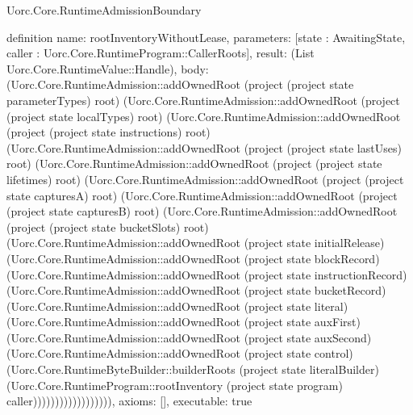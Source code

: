 \begin{lexlean}{Uorc.Core.RuntimeAdmissionBoundary}
\begin{semanticmodule}
definition{
  name: rootInventoryWithoutLease,
  parameters: [state : AwaitingState, caller : Uorc.Core.RuntimeProgram::CallerRoots],
  result: (List Uorc.Core.RuntimeValue::Handle),
  body: (Uorc.Core.RuntimeAdmission::addOwnedRoot (project (project state parameterTypes) root) (Uorc.Core.RuntimeAdmission::addOwnedRoot (project (project state localTypes) root) (Uorc.Core.RuntimeAdmission::addOwnedRoot (project (project state instructions) root) (Uorc.Core.RuntimeAdmission::addOwnedRoot (project (project state lastUses) root) (Uorc.Core.RuntimeAdmission::addOwnedRoot (project (project state lifetimes) root) (Uorc.Core.RuntimeAdmission::addOwnedRoot (project (project state capturesA) root) (Uorc.Core.RuntimeAdmission::addOwnedRoot (project (project state capturesB) root) (Uorc.Core.RuntimeAdmission::addOwnedRoot (project (project state bucketSlots) root) (Uorc.Core.RuntimeAdmission::addOwnedRoot (project state initialRelease) (Uorc.Core.RuntimeAdmission::addOwnedRoot (project state blockRecord) (Uorc.Core.RuntimeAdmission::addOwnedRoot (project state instructionRecord) (Uorc.Core.RuntimeAdmission::addOwnedRoot (project state bucketRecord) (Uorc.Core.RuntimeAdmission::addOwnedRoot (project state literal) (Uorc.Core.RuntimeAdmission::addOwnedRoot (project state auxFirst) (Uorc.Core.RuntimeAdmission::addOwnedRoot (project state auxSecond) (Uorc.Core.RuntimeAdmission::addOwnedRoot (project state control) (Uorc.Core.RuntimeByteBuilder::builderRoots (project state literalBuilder) (Uorc.Core.RuntimeProgram::rootInventory (project state program) caller)))))))))))))))))),
  axioms: [],
  executable: true
}


\end{semanticmodule}
\end{lexlean}
